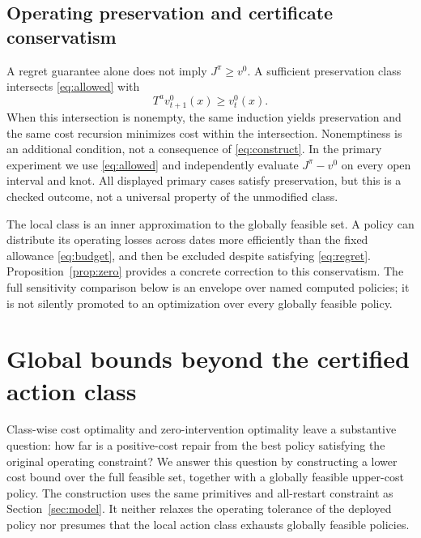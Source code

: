 \subsection{Operating preservation and certificate conservatism}
A regret guarantee alone does not imply $J^\pi\ge v^0$. A sufficient preservation class intersects \eqref{eq:allowed} with
\begin{equation}\label{eq:preserve}
 T^a v_{t+1}^0(x)\ge v_t^0(x).
\end{equation}
When this intersection is nonempty, the same induction yields preservation and the same cost recursion minimizes cost within the intersection. Nonemptiness is an additional condition, not a consequence of \eqref{eq:construct}. In the primary experiment we use \eqref{eq:allowed} and independently evaluate $J^\pi-v^0$ on every open interval and knot. All displayed primary cases satisfy preservation, but this is a checked outcome, not a universal property of the unmodified class.

The local class is an inner approximation to the globally feasible set. A policy can distribute its operating losses across dates more efficiently than the fixed allowance \eqref{eq:budget}, and then be excluded despite satisfying \eqref{eq:regret}. Proposition~\ref{prop:zero} provides a concrete correction to this conservatism. The full sensitivity comparison below is an envelope over named computed policies; it is not silently promoted to an optimization over every globally feasible policy.

\section{Global bounds beyond the certified action class}\label{sec:global}
Class-wise cost optimality and zero-intervention optimality leave a substantive question: how far is a positive-cost repair from the best policy satisfying the original operating constraint? We answer this question by constructing a lower cost bound over the full feasible set, together with a globally feasible upper-cost policy. The construction uses the same primitives and all-restart constraint as Section~\ref{sec:model}. It neither relaxes the operating tolerance of the deployed policy nor presumes that the local action class exhausts globally feasible policies.

